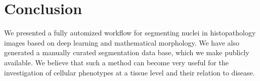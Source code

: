 \documentclass{article}
\begin{document}
\section{Conclusion}
\label{sec:conclusion}

\noindent We presented a fully automized workflow for segmenting nuclei in
histopathology images based on deep learning and mathematical
morphology. We have also generated a manually curated segmentation
data base, which we make publicly available. We believe that such a
method can become very useful for the investigation of cellular
phenotypes at a tissue level and their relation to disease. 



\end{document}
